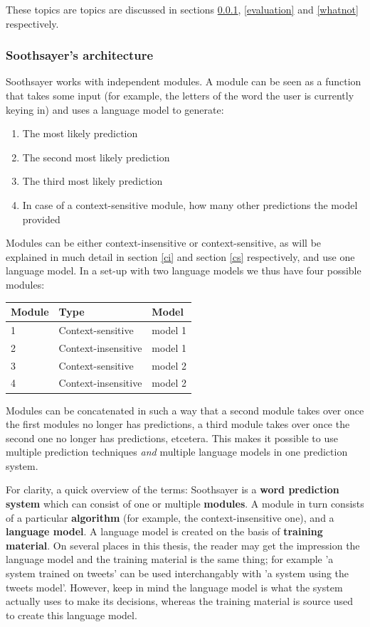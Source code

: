 \documentclass[12pt]{article}
\let\originaltable\table
\let\endoriginaltable\endtable
\renewenvironment{table}[1][ht]{%
  \originaltable[#1]
  \centering}%
  {\endoriginaltable}
\begin{document}
These topics are topics are discussed in sections \ref{ss_intro}, \ref{evaluation} and \ref{whatnot} respectively.

\subsubsection{Soothsayer's architecture} \label{ss_intro}
Soothsayer works with independent modules. A module can be seen as a function that takes some input (for example, the letters of the word the user is currently keying in) and uses a language model to generate:

\begin{enumerate}
\item The most likely prediction
\item The second most likely prediction
\item The third most likely prediction
\item In case of a context-sensitive module, how many other predictions the model provided
\end{enumerate}

Modules can be either context-insensitive or context-sensitive, as will be explained in much detail in section \ref{ci} and section \ref{cs} respectively, and use one language model. In a set-up with two language models we thus have four possible modules:

\begin{table}[h]
\begin{tabular}{lll} 
Module&Type&Model\\
\hline
1&Context-sensitive&model 1\\
2&Context-insensitive&model 1\\
3&Context-sensitive&model 2\\
4&Context-insensitive&model 2\\
\end{tabular} 
\caption{A possible module set-up for Soothsayer}
\end{table}

Modules can be concatenated in such a way that a second module takes over once the first modules no longer has predictions, a third module takes over once the second one no longer has predictions, etcetera. This makes it possible to use multiple prediction techniques \emph{and} multiple language models in one prediction system.

For clarity, a quick overview of the terms: Soothsayer is a \textbf{word prediction system} which can consist of one or multiple \textbf{modules}. A module in turn consists of a particular \textbf{algorithm} (for example, the context-insensitive one), and a \textbf{language model}. A language model is created on the basis of \textbf{training material}. On several places in this thesis, the reader may get the impression the language model and the training material is the same thing; for example 'a system trained on tweets' can be used interchangably with 'a system using the tweets model'. However, keep in mind the language model is what the system actually uses to make its decisions, whereas the training material is source used to create this language model.
\end{document}
